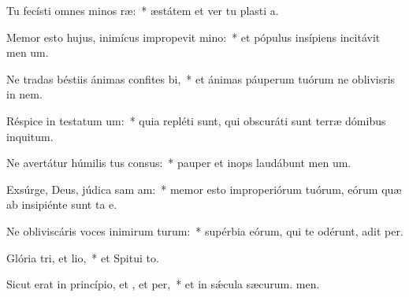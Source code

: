 \item Tu fecísti omnes minos ræ:~* æstátem et ver tu plasti a.
\item Memor esto hujus, inimícus impropevit mino:~* et pópulus insípiens incitávit men um.
\item Ne tradas béstiis ánimas confites bi,~* et ánimas páuperum tuórum ne oblivisris in nem.
\item Réspice in testatum um:~* quia repléti sunt, qui obscuráti sunt terræ dómibus inquitum.
\item Ne avertátur húmilis tus consus:~* pauper et inops laudábunt men um.
\item Exsúrge, Deus, júdica sam am:~* memor esto improperiórum tuórum, eórum quæ ab insipiénte sunt ta e.
\item Ne obliviscáris voces inimirum turum:~* supérbia eórum, qui te odérunt, adit per.
\item Glória tri, et lio,~* et Spitui to.
\item Sicut erat in princípio, et , et per,~* et in sǽcula sæcurum. men.
